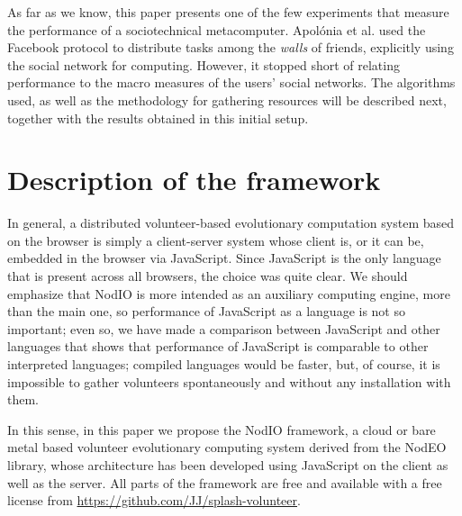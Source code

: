 \documentclass[letterpaper]{article}
\begin{document}
As far as we know, this paper presents one of the few experiments
that measure the performance of a sociotechnical
metacomputer. Apolónia et al. \citep{apolonia2012enhancing} used the
Facebook protocol to distribute tasks among the {\em walls} of
friends, explicitly using the social network for computing. However,
it stopped short of relating performance to the macro measures of the
users' social networks. 
The algorithms used, as well as the methodology 
for gathering resources will be described next, 
together with the results obtained in this initial setup.


\section{Description of the framework}
\label{sec:description}

In general, a distributed volunteer-based evolutionary computation
system based on the browser is simply a client-server system
whose client is, or it can be, embedded in the browser via
JavaScript. Since JavaScript is  the only language that is present
across all browsers, the choice was quite clear. We should emphasize
that NodIO is more intended as an auxiliary computing engine, more
than the main one, so performance of JavaScript as a language is not
so important; even so, we have made a comparison between JavaScript and other languages
\citep{2015arXiv151101088M} that shows that performance of JavaScript
is comparable to other interpreted languages; compiled languages would
be faster, but, of course, it is impossible to gather volunteers
spontaneously and without any installation with them.

In this sense, in this paper we propose the {\sf NodIO} framework, a
cloud or bare metal based volunteer evolutionary computing system
derived from %
 the {\sf NodEO} library, whose architecture has been
developed using JavaScript on the client as well as the server.
All parts of the framework are free and available with a free license
from \url{https://github.com/JJ/splash-volunteer}.

\end{document}
